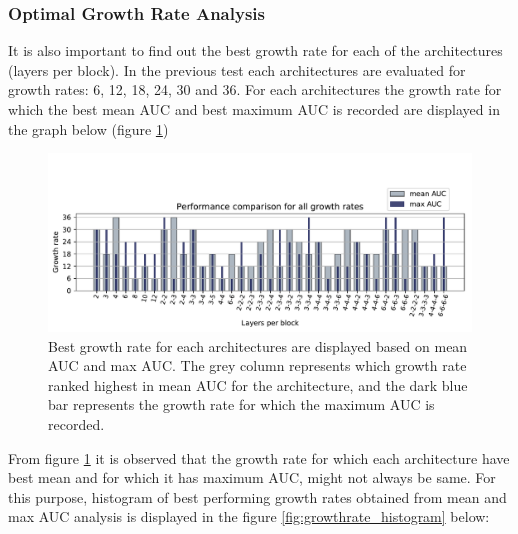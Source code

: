 \subsubsection{Optimal Growth Rate Analysis}
It is also important to find out the best growth rate for each of the architectures (layers per block). In the previous test each architectures are evaluated for growth rates: 6, 12, 18, 24, 30 and 36. 
For each architectures the growth rate for which the best mean AUC and best maximum AUC is recorded are displayed in the graph below (figure \ref{fig:best_growthrate})

\begin{figure}[ht]
\centering
\includegraphics[width=1\textwidth]{images/densenet/siamese/densenet_siamese_gr_all_bar}
\caption[Best growth rate analysis.]{Best growth rate for each architectures are displayed based on mean AUC and max AUC. The grey column represents which growth rate ranked highest in mean AUC for the architecture, 
and the dark blue bar represents the growth rate for which the maximum AUC is recorded.}
\label{fig:best_growthrate}
\end{figure}

From figure \ref{fig:best_growthrate} it is observed that the growth rate for which each architecture have best mean and for which it has maximum AUC, might not always be same. For this purpose, histogram of 
best performing growth rates obtained from mean and max AUC analysis is displayed in the figure \ref{fig:growthrate_histogram} below:

